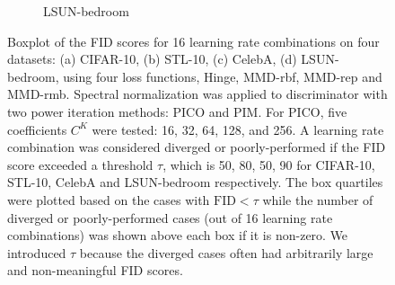 \documentclass{article} %
\theoremstyle{plain}
\newtheorem*{proposition 1*}{Proposition 1}
\begin{document}
\begin{appendices}
\begin{figure}[!ht]
\begin{subfigure}[t]{\linewidth}
		\caption{LSUN-bedroom\label{fig:pico_fid_lsun}}
	\end{subfigure}
	\caption{Boxplot of the FID scores for 16 learning rate combinations on four datasets: (a) CIFAR-10, (b) STL-10, (c) CelebA, (d) LSUN-bedroom, using four loss functions, Hinge, MMD-rbf, MMD-rep and MMD-rmb. Spectral normalization was applied to discriminator with two power iteration methods: PICO and PIM. For PICO, five coefficients \(C^K\) were tested: 16, 32, 64, 128, and 256. A learning rate combination was considered diverged or poorly-performed if the FID score exceeded a threshold \(\tau\), which is 50, 80, 50, 90 for CIFAR-10, STL-10, CelebA and LSUN-bedroom respectively. The box quartiles were plotted based on the cases with \(\text{FID}<\tau\) while the number of diverged or poorly-performed cases (out of 16 learning rate combinations) was shown above each box if it is non-zero. We introduced \(\tau\) because the diverged cases often had arbitrarily large and non-meaningful FID scores.\label{fig:pico_vs_pim}}
\end{figure}


\end{appendices}
\end{document}
